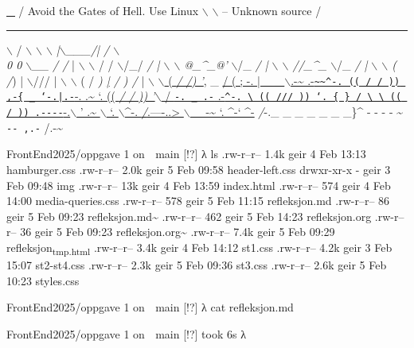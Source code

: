 \documentclass[11pt]{article}
\date{\today}
\title{}
\begin{document}
\tableofcontents

 \uline{\uline{\uline{\uline{\uline{\uline{\uline{\uline{\uline{\uline{\uline{\uline{\uline{\uline{\uline{\uline{\uline{\uline{\_}}}}}}}}}}}}}}}}}} 
/ Avoid the Gates of Hell.  Use Linux $\backslash$
$\backslash$               -- Unknown source     /

\noindent\rule{\textwidth}{0.5pt}
     $\backslash$                    / $\backslash$  \emph{\emph{$\backslash$
      $\backslash$    |$\backslash$_\_\_/|      /   $\backslash$}}  \\[0pt]
	   \emph{0  0  $\backslash$_\_  /    /}  | $\backslash$ $\backslash$    
	  /     /  $\backslash$/\_/    \emph{/   |  $\backslash$  $\backslash$  
	  @\_\^{}\_@'}   $\backslash$/\_   \emph{/    |   $\backslash$   $\backslash$ 
	  //\_\^{}\_}     $\backslash$/\_ \emph{/     |    $\backslash$    $\backslash$
       ( /}) |        $\backslash$///      |     $\backslash$     $\backslash$
     ( / \emph{) \uline{|} /   )  /}       |      $\backslash$     \uline{$\backslash$
   ( \emph{/ /) '},} \_ \uline{/  ( ; -.    |    \_ \_$\backslash$.-\textasciitilde{}        .-\texttt{\textasciitilde{}\textasciitilde{}\textasciicircum{}-.
  (( / / )) ,-\{        \_      `-.|.-}-.           .\textasciitilde{}         `.
(( \emph{/ / ))  '}$\backslash$      /                 \texttt{-. \_ .-}      .-\texttt{\textasciicircum{}-.  \textbackslash{}
 (( /// ))      `.   \{            \}                   /      \textbackslash{}  \textbackslash{}
  (( / ))     .-{}-{}-{}-{}}-.$\backslash$        \-'                 .\textasciitilde{}         $\backslash$  `. $\backslash$^-.
	    \emph{/}.----..>        $\backslash$             \_ -\textasciitilde{}             `.  \^{}-`  \^{}-}
	      \emph{/}-.\_ \_ \_ \_ \_ \_ \_\}\^{} - - - - \textasciitilde{}                     \texttt{-{}-{} ,.-}
								 /.-\textasciitilde{}

FrontEnd2025/oppgave 1 on  main [!?] 
λ  ls
.rw-r--r-- 1.4k geir  4 Feb 13:13 hamburger.css
.rw-r--r-- 2.0k geir  5 Feb 09:58 header-left.css
drwxr-xr-x    - geir  3 Feb 09:48 img
.rw-r--r--  13k geir  4 Feb 13:59 index.html
.rw-r--r--  574 geir  4 Feb 14:00 media-queries.css
.rw-r--r--  578 geir  5 Feb 11:15 refleksjon.md
.rw-r--r--   86 geir  5 Feb 09:23 refleksjon.md\textasciitilde{}
.rw-r--r--  462 geir  5 Feb 14:23 refleksjon.org
.rw-r--r--   36 geir  5 Feb 09:23 refleksjon.org\textasciitilde{}
.rw-r--r-- 7.4k geir  5 Feb 09:29 refleksjon\textsubscript{tmp.html}
.rw-r--r-- 3.4k geir  4 Feb 14:12 st1.css
.rw-r--r-- 4.2k geir  3 Feb 15:07 st2-st4.css
.rw-r--r-- 2.3k geir  5 Feb 09:36 st3.css
.rw-r--r-- 2.6k geir  5 Feb 10:23 styles.css

FrontEnd2025/oppgave 1 on  main [!?] 
λ  cat refleksjon.md                      

FrontEnd2025/oppgave 1 on  main [!?] took 6s 
λ  
\end{document}
